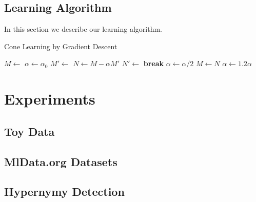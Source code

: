 \documentclass{article}
\begin{document}
\subsection{Learning Algorithm}

In this section we describe our learning algorithm.

\begin{algorithm}
\caption{Cone Learning by Gradient Descent}\label{algorithm:cone}
\begin{algorithmic}
  \State $M \gets$ 
  \State $\alpha \gets \alpha_0$
  \Loop
    \State $M' \gets$ 
    \Loop
      \State $N \gets M - \alpha M'$
      \State $N' \gets$ 
        \State \textbf{break}
      \EndIf
      \State $\alpha \gets \alpha/2$
    \EndLoop
    \State $M \gets N$
    \State $\alpha \gets 1.2\alpha$
  \EndLoop
  \EndProcedure
\end{algorithmic}
\end{algorithm}

\section{Experiments}

\subsection{Toy Data}

\subsection{MlData.org Datasets}

\subsection{Hypernymy Detection}
\end{document}
